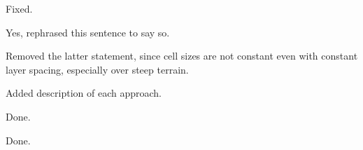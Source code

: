 \documentclass{article}
\begin{document}
\begin{quotation}
\begin{comment}
\item Line 33, typo: `\ldots approaches to respresenting \ldots'
\end{comment}
\end{quotation}
Fixed.

\begin{quotation}
\begin{comment}
\item Line 53/54: do you mean interpolations to z-levels in order to compute the pressure gradient?
\end{comment}
\end{quotation}
Yes, rephrased this sentence to say so.

\begin{quotation}
\begin{comment}
\item Line 58/59: conflicting information: you highlight the variable spacing and then the fact that cell sizes remain almost constant
\end{comment}
\end{quotation}
Removed the latter statement, since cell sizes are not constant even with constant layer spacing, especially over steep terrain.

\begin{quotation}
\begin{comment}
\item Line 67: provide some brief information about the `several approaches'.  A since sentence does not justify a paragraph.
\end{comment}
\end{quotation}
Added description of each approach.

\begin{quotation}
\begin{comment}
\item Line 80: add `\ldots artificially weak in the Eta model'.
\end{comment}
\end{quotation}
Done.

\begin{quotation}
\begin{comment}
\item Line 102: be more explicit: `\ldots of the Cartesian coordinate surface at the model level with transformed height $z^\star$'.  Spell out explicitly that $z$ varies between $h$ and $H$ and that $z^\star$ varies between 0 and $H$.
\end{comment}
\end{quotation}
Done.
\end{document}
